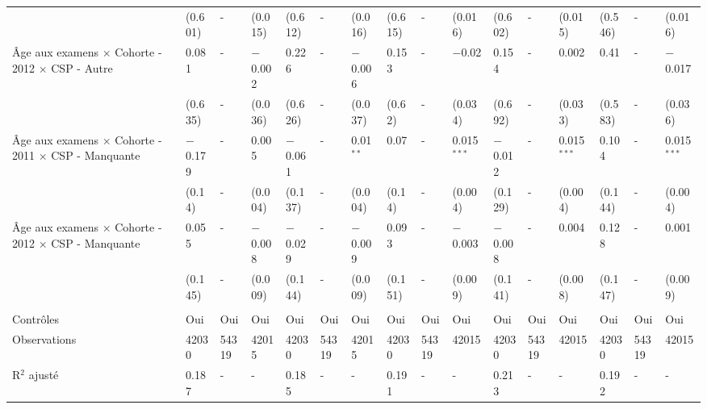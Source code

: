 \documentclass[
]{book}
\begin{document}
\begin{ThreePartTable}
\begin{longtable}[t]{llllllllllllllll}
 & (0.601) & - & (0.015) & (0.612) & - & (0.016) & (0.615) & - & (0.016) & (0.602) & - & (0.015) & (0.546) & - & (0.016)\\
Âge aux examens $\times$ Cohorte - 2012 $\times$ CSP - Autre & 0.081 & - & $-$0.002 & 0.226 & - & $-$0.006 & 0.153 & - & $-$0.02 & 0.154 & - & 0.002 & 0.41 & - & $-$0.017\\
 & (0.635) & - & (0.036) & (0.626) & - & (0.037) & (0.62) & - & (0.034) & (0.692) & - & (0.033) & (0.583) & - & (0.036)\\
Âge aux examens $\times$ Cohorte - 2011 $\times$ CSP - Manquante & $-$0.179 & - & 0.005 & $-$0.061 & - & 0.01$^{**}$ & 0.07 & - & 0.015$^{***}$ & $-$0.012 & - & 0.015$^{***}$ & 0.104 & - & 0.015$^{***}$\\
 & (0.14) & - & (0.004) & (0.137) & - & (0.004) & (0.14) & - & (0.004) & (0.129) & - & (0.004) & (0.144) & - & (0.004)\\
Âge aux examens $\times$ Cohorte - 2012 $\times$ CSP - Manquante & 0.055 & - & $-$0.008 & $-$0.029 & - & $-$0.009 & 0.093 & - & $-$0.003 & $-$0.008 & - & 0.004 & 0.128 & - & 0.001\\
 & (0.145) & - & (0.009) & (0.144) & - & (0.009) & (0.151) & - & (0.009) & (0.141) & - & (0.008) & (0.147) & - & (0.009)\\
 &  &  &  &  &  &  &  &  &  &  &  &  &  &  & \\
Contrôles & Oui & Oui & Oui & Oui & Oui & Oui & Oui & Oui & Oui & Oui & Oui & Oui & Oui & Oui & Oui\\
Observations & 42030 & 54319 & 42015 & 42030 & 54319 & 42015 & 42030 & 54319 & 42015 & 42030 & 54319 & 42015 & 42030 & 54319 & 42015\\
R$^2$ ajusté & 0.187 & - & - & 0.185 & - & - & 0.191 & - & - & 0.213 & - & - & 0.192 & - & -\\*
\end{longtable}
\end{ThreePartTable}
\endgroup{}

\begingroup\fontsize{4}{6}\selectfont
\end{document}

